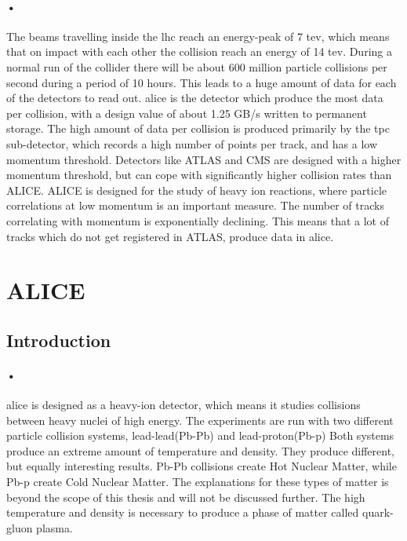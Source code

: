 \documentclass[a4paper, 12pt]{report}\dfrac{\right }{•}
\begin{document}
\paragraph{•}
The beams travelling inside the \gls{lhc} reach an energy-peak of 7 \gls{tev}, which means that on impact with each other the collision reach an energy of 14 \gls{tev}\cite{lhc-pdf}.
During a normal run of the collider there will be about 600 million particle collisions per second during a period of 10 hours.
This leads to a huge amount of data for each of the detectors to read out.
\gls{alice} is the detector which produce the most data per collision, with a design value of about 1.25 GB/s written to permanent storage.
The high amount of data per collision is produced primarily by the \gls{tpc} sub-detector, which records a high number of points per track, and has a low momentum threshold. Detectors like ATLAS and CMS  are designed with a higher momentum threshold, but can cope with significantly higher collision rates than ALICE.
ALICE is designed for the study of heavy ion reactions, where particle correlations at low momentum is an important measure.
The number of tracks correlating with momentum is exponentially declining.
This means that a lot of tracks which do not get registered in ATLAS, produce data in \gls{alice}.

\section{ALICE}
\subsection{Introduction}

\paragraph{•}
\gls{alice} is designed as a heavy-ion detector, which means it studies collisions between heavy nuclei of high energy\cite{alice-home}.
The experiments are run with two different particle collision systems, lead-lead(Pb-Pb) and lead-proton(Pb-p)
Both systems produce an extreme amount of temperature and density.
They produce different, but equally interesting results.
Pb-Pb collisions create Hot Nuclear Matter, while Pb-p create Cold Nuclear Matter.
The explanations for these types of matter is beyond the scope of this thesis and will not be discussed further.
The high temperature and density is necessary to produce a phase of matter called quark-gluon plasma.
\end{document}
